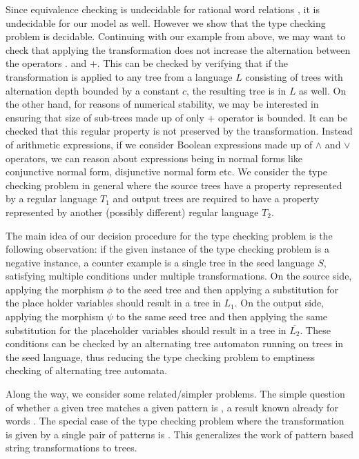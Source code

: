 \documentclass[12pt, a4paper]{article}
\begin{document}
Since equivalence checking is undecidable for rational word relations \cite{G1968}, it is undecidable for our model as well. However we show that the type checking problem is decidable. Continuing with our example from above, we may want to check that applying the transformation does not increase the alternation between the operators $.$ and $+$. This can be checked by verifying that if the transformation is applied to any tree from a language $L$ consisting of trees with alternation depth bounded by a constant $c$, the resulting tree is in $L$ as well. On the other hand, for reasons of numerical stability, we may be interested in ensuring that size of sub-trees made up of only $+$ operator is bounded. It can
be checked that this regular property is not preserved by the transformation. Instead of arithmetic expressions, if we consider Boolean expressions made up of $\land$ and $\lor$ operators, we can reason about expressions being in normal forms like conjunctive normal form, disjunctive normal form etc. We consider the type checking problem in general where the source trees have a property represented by a regular language $T_{1}$ and output trees are required to have a property represented by another (possibly different) regular language $T_{2}$.

The main idea of our decision procedure for the type checking problem is the following observation: if the given instance of the type checking problem is a negative instance, a counter example is a single tree in the seed language $S$, satisfying multiple conditions under multiple transformations. On the source side, applying the morphism $\phi$ to the seed tree and then applying a substitution for the place holder variables should result in a tree in $L_{1}$. On the output side, applying the morphism $\psi$ to the same seed tree and then applying the same substitution for the placeholder variables should result in a tree in $\overline{L_{2}}$. These conditions can be checked by an alternating tree automaton running on trees in the seed language, thus reducing the type checking problem to emptiness checking of alternating tree automata.

Along the way, we consider some related/simpler problems. The simple question of whether a given tree matches a given pattern is \npc, a result known already for words \cite{tata}. The special case of the type checking problem where the transformation is given by a single pair of patterns is \exptc. This generalizes the work of pattern based string transformations \cite{AMP2022} to trees.
\end{document}
